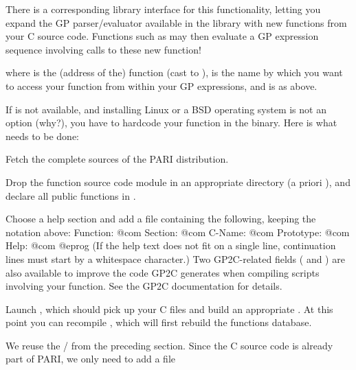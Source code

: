 
There is a corresponding library interface for this 
functionality, letting you expand the GP parser/evaluator available in the
library with new functions from your C source code. Functions such as
 may then evaluate a GP expression sequence involving calls
to these new function!


\noindent where  is the (address of the) function (cast to
),  is the name by which you want to access your
function from within your GP expressions, and  is as above.



If  is not available, and installing Linux or a BSD operating
system is not an option (why?), you have to hardcode your function in the
 binary. Here is what needs to be done:

\item Fetch the complete sources of the PARI distribution.

\item Drop the function source code module in an appropriate directory
(a priori ), and declare all public functions
in .

\item Choose a help section and add a file
containing the following, keeping the notation above:
\bprog
Function:  @com
Section:   @com
C-Name:    @com
Prototype: @com
Help:      @com
@eprog\noindent
(If the help text does not fit on a single line, continuation lines must
start by a whitespace character.) Two GP2C-related fields (
and ) are also available to improve the code GP2C generates when
compiling scripts involving your function. See the GP2C documentation for details.

\item Launch , which should pick up your C files and build an
appropriate . At this point you can recompile , which
will first rebuild the functions database.

 We reuse the  / 
from the preceding section. Since the C source code is already part
of PARI, we only need to add a file


